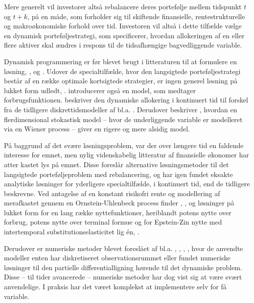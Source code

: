 \documentclass[
  a4paper,
  oneside]{memoir}
\begin{document}
Mere generelt vil investorer altså rebalancere deres portefølje mellem tidspunkt \(t\) og \(t+k\), på en måde, som forholder sig til skiftende finansielle, rentestrukturelle og makroøkonomiske forhold over tid. Investoren vil altså i dette tilfælde vælge en dynamisk porteføljestrategi, som specificerer, hvordan allokeringen af en eller flere aktiver skal ændres i respons til de tidsafhængige bagvedliggende variable.

Dynamisk programmering er før blevet brugt i litteraturen til at formulere en løsning, \citep{Mossin1968}, \citep{Samuelson1969} og \citep{Merton1969, Merton1971, Merton1973}. Udover de specialtilfælde, hvor den langsigtede porteføljestrategi består af en række optimale kortsigtede strategier, er ingen generel løsning på lukket form udledt, \citep{JurVic2011}. \citep{Samuelson1969} introducerer også en model, som medtager forbrugsfunktionen. \citep{Merton1969} beskriver den dynamiske allokering i kontinuert tid til forskel fra de tidligere diskrettidsmodeller af bl.a. \citep{Samuelson1969}. Derudover beskriver \citep{Merton1969}, hvordan en flerdimensional stokastisk model -- hvor de underliggende variable er modelleret via en Wiener process -- giver en rigere og mere alsidig model.

På baggrund af det svære løsningsproblem, var der over længere tid en faldende interesse for emnet, men nylig videnskabelig litteratur af finansielle økonomer har atter kastet lys på emnet. Disse foreslår alternative løsningsmetoder til det langsigtede porteføljeproblem med rebalancering, og har igen fundet eksakte analytiske løsninger for yderligere specialtilfælde, i kontinuert tid, end de tidligere beskrevne. Ved antagelse af en konstant risikofri rente og modellering af merafkastet gennem en Ornstein-Uhlenbeck process finder \citep{BrenXia2002}, \citep{CampVic1999}, \citep{KimOm1996} og \citep{Wachter2002} løsninger på lukket form for en lang række nyttefunktioner, heriblandt potens nytte over forbrug, potens nytte over terminal formue og for Epstein-Zin nytte med intertemporal substitutionselasticitet lig én, \citep{CampVic2003}.

Derudover er numeriske metoder blevet foreslået af bl.a. \citep{BalLyn1999}, \citep{Lyn2001}, \citep{Bar2000}, \citep{BrenSchLag1997, BrenSchLag1999}, hvor de anvendte modeller enten har diskretiseret observationsrummet eller fundet numeriske løsninger til den partielle differentialligning hørende til det dynamiske problem. Disse -- til tider avancerede -- numeriske metoder har dog vist sig at være svært anvendelige. I praksis har det været komplekst at implementere selv for få variable.
\end{document}
